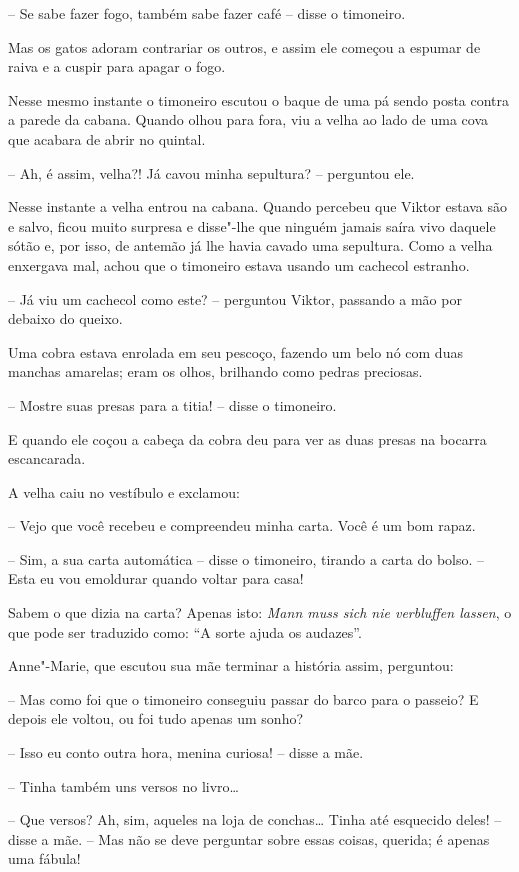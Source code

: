 -- Se sabe fazer fogo, também sabe fazer café -- disse o timoneiro.

Mas os gatos adoram contrariar os outros, e assim ele começou a espumar
de raiva e a cuspir para apagar o fogo.

Nesse mesmo instante o timoneiro escutou o baque de uma pá sendo posta
contra a parede da cabana. Quando olhou para fora, viu a velha ao lado
de uma cova que acabara de abrir no quintal.

-- Ah, é assim, velha?! Já cavou minha sepultura? -- perguntou ele.

Nesse instante a velha entrou na cabana. Quando percebeu que Viktor
estava são e salvo, ficou muito surpresa e disse"-lhe que ninguém
jamais saíra vivo daquele sótão e, por isso, de antemão já lhe havia
cavado uma sepultura. Como a velha enxergava mal, achou que o timoneiro
estava usando um cachecol estranho.

-- Já viu um cachecol como este? -- perguntou Viktor, passando a mão por
debaixo do queixo.

Uma cobra estava enrolada em seu pescoço, fazendo um belo nó com duas
manchas amarelas; eram os olhos, brilhando como pedras preciosas.

-- Mostre suas presas para a titia! -- disse o timoneiro.

E quando ele coçou a cabeça da cobra deu para ver as duas presas na
bocarra escancarada. 

A velha caiu no vestíbulo e exclamou:

-- Vejo que você recebeu e compreendeu minha carta. Você é um bom rapaz.

-- Sim, a sua carta automática -- disse o timoneiro, tirando a carta do
bolso. -- Esta eu vou emoldurar quando voltar para casa!

Sabem o que dizia na carta? Apenas isto: \textit{Mann muss sich nie
verbluffen lassen}, o que pode ser traduzido como: ``A sorte ajuda os
audazes''.
\asterisc

Anne"-Marie, que escutou sua mãe terminar a história assim, perguntou:

 -- Mas como foi que o timoneiro conseguiu passar do barco para o
passeio? E depois ele voltou, ou foi tudo apenas um sonho?

-- Isso eu conto outra hora, menina curiosa! -- disse a mãe.

-- Tinha também uns versos no livro\ldots{}

-- Que versos? Ah, sim, aqueles na loja de conchas\ldots{} Tinha até esquecido
deles! -- disse a mãe. -- Mas não se deve perguntar sobre essas coisas,
querida; é apenas uma fábula!

